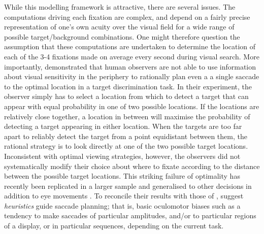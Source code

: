 While this modelling framework is attractive, there are several issues. The computations driving each fixation are complex, and depend on a fairly precise representation of one's own acuity over the visual field for a wide range of possible target/background combinations. One might therefore question the assumption that these computations are undertaken to determine the location of each of the 3-4 fixations made on average every second during visual search. More importantly,  \cite{morvan-maloney2012} demonstrated that human observers are not able to use information about visual sensitivity in the periphery to rationally plan even a a single saccade to the optimal location in a target discrimination task. In their experiment, the observer simply has to select a location from which to detect a target that can appear with equal probability in one of two possible locations. If the locations are relatively close together, a location in between will maximise the probability of detecting a target appearing in either location. When the targets are too far apart to reliably detect the target from a point equidistant between them, the rational strategy is to look directly at one of the two possible target locations. Inconsistent with optimal viewing strategies, however, the observers did not systematically modify their choice about where to fixate according to the distance between the possible target locations. This striking failure of optimality has recently been replicated in a larger sample and generalised to other decisions in addition to eye movements  \citep{clarke-hunt2015}. To reconcile their results with those of  \cite{najemnik-geisler2008},  \cite{morvan-maloney2012} suggest \textit{heuristics} guide saccade planning; that is, basic oculomotor biases such as a tendency to make saccades of particular amplitudes, and/or to particular regions of a display, or in particular sequences, depending on the current task. 

